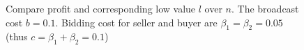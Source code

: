 \begin{figure}
\centering
  \caption{Compare profit and corresponding low value $l$ over $n$. The
  broadcast cost $b = 0.1$. Bidding cost for seller and buyer are $\beta_1 =
  \beta_2 = 0.05$ (thus $c = \beta_1+\beta_2 = 0.1$)}\label{fig:general}
\end{figure}

